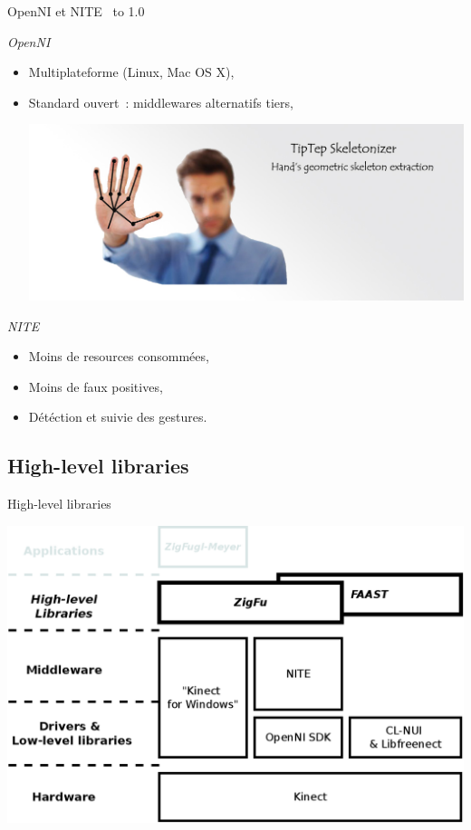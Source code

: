 \begin{frame}{OpenNI et NITE~\cite{microsoft_vs_openni}}
\vbox to 1.0\textheight
{
  \emph{OpenNI}
  \begin{itemize}
    \item<1-> Multiplateforme (Linux, Mac OS X),
    \item<2-> Standard ouvert~: middlewares alternatifs tiers,
    {
      \vfill
      \begin{center}
      \includegraphics[width=0.8\linewidth]{../images/tiptep}
      \end{center}
    }
  \end{itemize}
  
  {
  \emph{NITE}
  \begin{itemize}
    \item<3-> Moins de resources consommées,
    \item<4-> Moins de faux positives,
    \item<5-> Détéction et suivie des \og{}gestures\fg{}.
  \end{itemize}
  }
\vfill
}
\end{frame}

\subsection{High-level libraries}
\begin{frame}{High-level libraries}
\begin{center}
\includegraphics[width=0.9\linewidth]{../images/technology_overview_3}
\end{center}
\end{frame}

